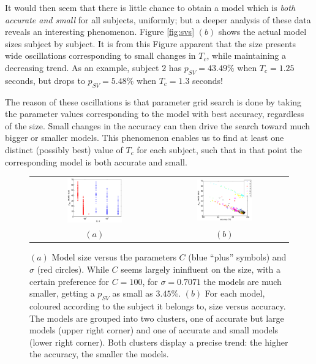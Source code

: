 \documentclass[a4paper,10pt,conference]{ieeeconf}
\begin{document}
It would then seem that there is little chance to obtain a model which
is \emph{both accurate and small} for all subjects, uniformly; but a
deeper analysis of these data reveals an interesting
phenomenon. Figure \ref{fig:svs} $(b)$ shows the actual model sizes
subject by subject. It is from this Figure apparent that the size
presents wide oscillations corresponding to small changes in $T_c$,
while maintaining a decreasing trend. As an example, subject $2$ has
$p_{SV}=43.49\%$ when $T_c=1.25$ seconds, but drops to $p_{SV}=5.48\%$
when $T_c=1.3$ seconds!

The reason of these oscillations is that parameter grid search is done
by taking the parameter values corresponding to the model with best
accuracy, regardless of the size. Small changes in the accuracy can
then drive the search toward much bigger or smaller models. This
phenomenon enables us to find at least one distinct (possibly best)
value of $T_c$ for each subject, such that in that point the
corresponding model is both accurate and small.

\begin{figure}[!t]
  \centering
    \begin{tabular}{cc}
      \includegraphics[width=0.45\textwidth]{svs_params.eps} &
      \includegraphics[width=0.45\textwidth]{acc_svs.eps} \\
      $(a)$ & $(b)$
    \end{tabular}
    \caption{$(a)$ Model size versus the parameters $C$ (blue ``plus''
    symbols) and $\sigma$ (red circles). While $C$ seems largely
    ininfluent on the size, with a certain preference for $C=100$, for
    $\sigma=0.7071$ the models are much smaller, getting a $p_{SV}$ as
    small as $3.45\%$. $(b)$ For each model, coloured according to the
    subject it belongs to, size versus accuracy. The models are
    grouped into two clusters, one of accurate but large models (upper
    right corner) and one of accurate and small models (lower right
    corner). Both clusters display a precise trend: the higher the
    accuracy, the smaller the models.}
    \label{fig:svs_params}
\end{figure}
\end{document}
